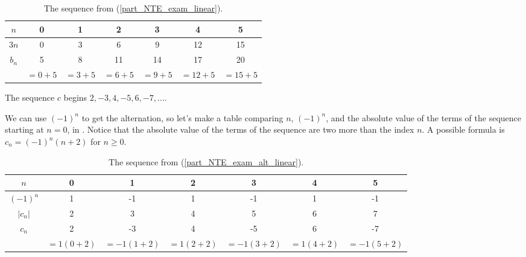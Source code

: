 \begin{exam}
\begin{apart}
                \begin{table}[hbtp]
                    \centering
                    \begin{tabular}{c|c|c |c|c|c |c}
                        $n$ & 0 & 1 & 2 & 3 & 4 & 5  \\ \hline
                        $3n$ & 0 & 3 & 6 & 9 & 12 & 15  \\ \hline
                        $b_n$ & 5 & 8 & 11 & 14 & 17 & 20\\
                        & $=0+5$ & $=3+5$ & $=6+5$ & $=9+5$ & $=12+5$ & $=15+5$ \\ 
                    \end{tabular}
                    \caption{The sequence from  (\ref{part_NTE_exam_linear}).}
                    \label{tab_NTE_exam_linear}
                \end{table}
                
            \item \label{part_NTE_exam_alt_linear} The sequence $c$ begins $2, -3, 4, -5, 6, -7,\ldots$.  
                \begin{soln}
                    We can use $(-1)^n$ to get the alternation, so let's make a table comparing $n$, $(-1)^n$, and the absolute value of the terms of the sequence starting at $n=0$, in . Notice that the absolute value of the terms of the sequence are two more than the index $n$.   A possible formula is $c_n = (-1)^n(n+2)$ for $n \ge 0$.
                \end{soln}

                \begin{table}[hbtp]
                    \centering
                    \begin{tabular}{c|c|c |c|c|c |c}
                        $n$ & 0 & 1 & 2 & 3 & 4 & 5  \\ \hline
                        $(-1)^n$ & 1 & -1 & 1 & -1 & 1 & -1\\ \hline
                        $|c_n|$ & 2 & 3 & 4 & 5 & 6 & 7\\ \hline
                        $c_n$ & 2 & -3 & 4 & -5 & 6 & -7\\ 
                         & $=1(0+2)$ & $=-1(1+2)$ & $=1(2+2)$ & $=-1(3+2)$ & $=1(4+2)$ & $=-1(5+2)$ \\ 
                    \end{tabular}
                    \caption{The sequence from  (\ref{part_NTE_exam_alt_linear}).}
                    \label{tab_NTE_exam_alt_linear}
                \end{table}
            

\end{apart}
\end{exam}

